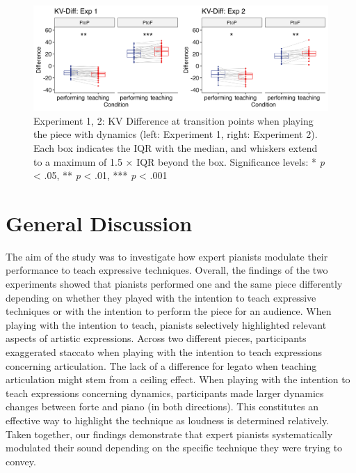\documentclass[
  man,floatsintext]{apa6}
\begin{document}
\begin{figure}
\includegraphics[width=1\linewidth]{manuscript_files/figure-latex/plot-vel-diff-1} \caption{\label{fig:vel-diff}Experiment 1, 2: KV Difference at transition points when playing the piece with dynamics (left: Experiment 1, right: Experiment 2). Each box indicates the IQR with the median, and whiskers extend to a maximum of 1.5 × IQR beyond the box. Significance levels: * \textit{p} < .05, ** \textit{p} < .01, *** \textit{p} < .001}\label{fig:plot-vel-diff}
\end{figure}

\newpage

\hypertarget{general-discussion}{%
\section{General Discussion}\label{general-discussion}}

The aim of the study was to investigate how expert pianists modulate their performance to teach expressive techniques. Overall, the findings of the two experiments showed that pianists performed one and the same piece differently depending on whether they played with the intention to teach expressive techniques or with the intention to perform the piece for an audience. When playing with the intention to teach, pianists selectively highlighted relevant aspects of artistic expressions. Across two different pieces, participants exaggerated staccato when playing with the intention to teach expressions concerning articulation. The lack of a difference for legato when teaching articulation might stem from a ceiling effect. When playing with the intention to teach expressions concerning dynamics, participants made larger dynamics changes between forte and piano (in both directions). This constitutes an effective way to highlight the technique as loudness is determined relatively. Taken together, our findings demonstrate that expert pianists systematically modulated their sound depending on the specific technique they were trying to convey.
\end{document}
